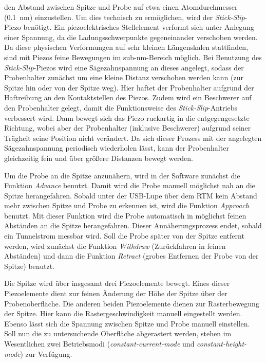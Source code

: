 den Abstand zwischen Spitze und Probe auf etwa einen Atomdurchmesser (\SI{0,1}{\nano \meter}) einzustellen. Um dies technisch zu ermöglichen, wird der
\textit{Stick-Slip}-Piezo benötigt. Ein piezoelektrisches Stellelement verformt sich unter Anlegung einer Spannung, da die Ladungsschwerpunkte
gegeneinander verschoben werden. Da diese physischen Verformungen auf sehr kleinen Längenskalen stattfinden, sind mit Piezos feine Bewegungen im sub-\unit{\nano \meter}-Bereich
möglich. Bei Benutzung des \textit{Stick-Slip}-Piezos wird eine Sägezahnspannung an dieses angelegt, sodass der Probenhalter zunächst um eine kleine Distanz
verschoben werden kann (zur Spitze hin oder von der Spitze weg). Hier haftet der Probenhalter aufgrund der Haftreibung an den Kontaktstellen des Piezos.
Zudem wird ein Beschwerer auf den Probenhalter gelegt, damit die Funktionsweise des \textit{Stick-Slip}-Antriebs verbessert wird.
Dann bewegt sich das Piezo ruckartig in die entgegengesetzte Richtung, wobei aber der Probenhalter (inklusive Beschwerer) aufgrund seiner Trägheit seine Position nicht verändert.
Da sich dieser Prozess mit der angelegten Sägezahnspannung periodisch wiederholen lässt, kann der Probenhalter gleichzeitig fein und über größere Distanzen bewegt werden.\par
Um die Probe an die Spitze anzunähern, wird in der Software zunächst die Funktion \textit{Advance} benutzt. Damit wird die Probe manuell möglichst nah an die Spitze
herangefahren. Sobald unter der USB-Lupe über dem RTM kein Abstand mehr zwischen Spitze und Probe zu erkennen ist, wird die Funktion \textit{Approach} benutzt.
Mit dieser Funktion wird die Probe automatisch in möglichst feinen Abständen an die Spitze herangefahren. Dieser Annäherungsprozess endet, sobald ein Tunnelstrom messbar wird.
Soll die Probe später von der Spitze entfernt werden, wird zunächst die Funktion \textit{Withdraw} (Zurückfahren in feinen Abständen) und dann die Funktion
\textit{Retract} (grobes Entfernen der Probe von der Spitze) benutzt.\par
Die Spitze wird über insgesamt drei Piezoelemente bewegt. Eines dieser Piezoelemente dient zur feinen Änderung der Höhe der Spitze über der Probenoberfläche.
Die anderen beiden Piezoelemente dienen zur Rasterbewegung der Spitze. Hier kann die Rastergeschwindigkeit manuell eingestellt werden.
Ebenso lässt sich die Spannung zwischen Spitze und Probe manuell einstellen. Soll nun die zu untersuchende Oberfläche abgerastert werden, stehen im Wesentlichen zwei
Betriebsmodi (\textit{constant-current-mode} und \textit{constant-height-mode}) zur Verfügung.\par
